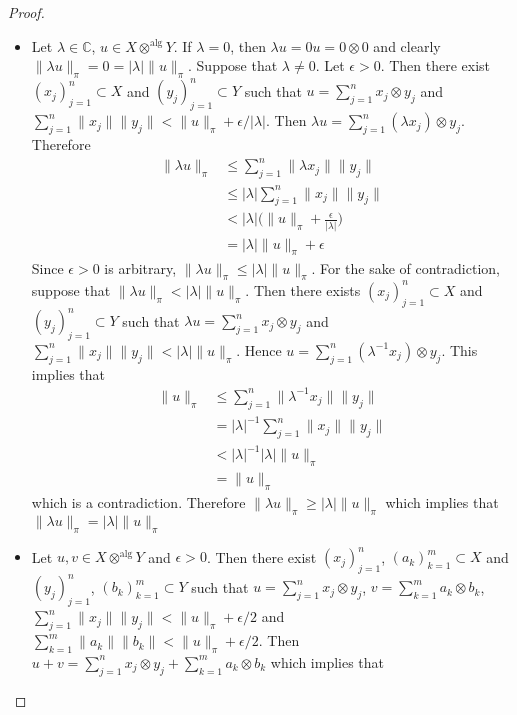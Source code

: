 \documentclass[12pt]{amsart}
\theoremstyle{definition}
\newcommand{\lam}{\lambda}
\newcommand{\ep}{\epsilon}
\newcommand{\C}{\mathbb{C}}
\DeclareMathOperator*{\0}{\mbf{0}}
\DeclareMathOperator*{\1}{\mbf{1}}
\begin{document}
	\begin{proof}\
	\begin{itemize}
	\item Let $\lam \in \C$, $u \in X \otimes^{\text{alg}} Y$. If $\lam = 0$, then $\lam u = 0  u = 0 \otimes 0$ and clearly $\|\lam u\|_{\pi} = 0 = |\lam|\|u\|_{\pi}$. Suppose that $\lam \neq 0$. Let $\ep >0$. Then there exist $(x_j)_{j=1}^n \subset X$ and $(y_j)_{j=1}^n \subset Y$ such that $u = \sum\limits_{j=1}^n x_j \otimes y_j $ and $\sum\limits_{j=1}^n \|x_j\| \|y_j\| < \|u\|_{\pi} + \ep/|\lam| $. Then $\lam u = \sum\limits_{j=1}^n (\lam x_j) \otimes y_j $.
	Therefore
	\begin{align*}
	\|\lam u\|_{\pi} 
	& \leq \sum\limits_{j=1}^n \|\lam x_j\| \|y_j\| \\
	& \leq |\lam| \sum\limits_{j=1}^n \| x_j\| \|y_j\| \\
	& < |\lam| \bigg( \|u\|_{\pi} + \frac{\ep}{|\lam|} \bigg) \\
	& = |\lam| \|u\|_{\pi} + \ep
	\end{align*}
	Since $\ep >0$ is arbitrary, $\|\lam u\|_{\pi} \leq |\lam| \|u\|_{\pi} $. For the sake of contradiction, suppose that $\|\lam u\|_{\pi} < |\lam| \|u\|_{\pi} $. Then there exists $(x_j)_{j=1}^n \subset X$ and $(y_j)_{j=1}^n \subset Y$ such that $\lam u = \sum\limits_{j=1}^n x_j \otimes y_j $ and $\sum\limits_{j=1}^n \|x_j\| \|y_j\| < |\lam| \|u\|_{\pi}$. Hence $u = \sum\limits_{j=1}^n (\lam^{-1}x_j) \otimes y_j$. This implies that 
	\begin{align*}
	\|u \|_{\pi} 
	& \leq \sum\limits_{j=1}^n \|\lam^{-1}x_j\| \|y_j\| \\
	&= |\lam |^{-1}\sum\limits_{j=1}^n \|x_j\| \|y_j\| \\
	&< |\lam |^{-1} |\lam| \|u\|_{\pi} \\
	&= \|u\|_{\pi}
	\end{align*}
	which is a contradiction. Therefore $\|\lam u\|_{\pi} \geq |\lam| \|u\|_{\pi}$ which implies that $\|\lam u\|_{\pi} = |\lam| \|u\|_{\pi}$
	\item Let $u, v \in X \otimes^{\text{alg}} Y$ and $\ep >0$. Then there exist $(x_j)_{j=1}^n$, $(a_k)_{k=1}^m \subset X$ and $(y_j)_{j=1}^n$, $(b_k)_{k=1}^m \subset Y$ such that $u = \sum\limits_{j=1}^n x_j \otimes y_j $, $v = \sum\limits_{k=1}^m a_k \otimes b_k $, $\sum\limits_{j=1}^n \|x_j\| \|y_j\| < \|u\|_{\pi} + \ep/2$ and $\sum\limits_{k=1}^m \|a_k\| \|b_k\| < \|u\|_{\pi} + \ep/2$. Then $u+v = \sum\limits_{j=1}^n x_j \otimes y_j + \sum\limits_{k=1}^m a_k \otimes b_k $ which implies that 

\end{itemize}
\end{proof}
\end{document}
